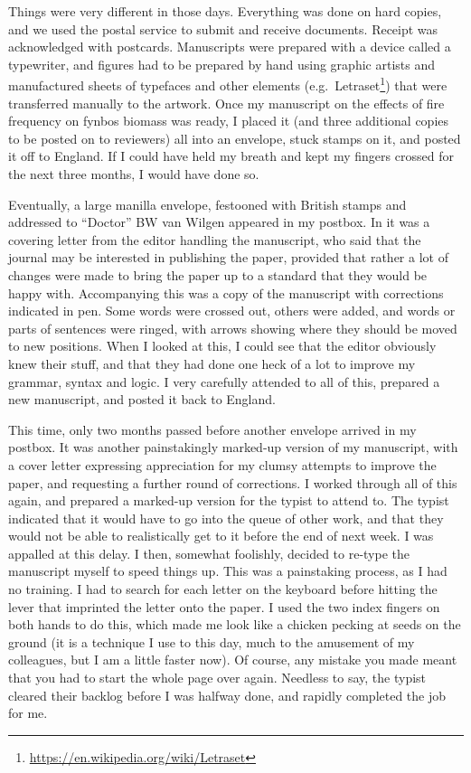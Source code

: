 \documentclass[
]{krantz}
\renewcommand{\href}[2]{#2\footnote{\url{#1}}}
\begin{document}
Things were very different in those days. Everything was done on hard copies, and we used the postal service to submit and receive documents. Receipt was acknowledged with postcards. Manuscripts were prepared with a device called a typewriter, and figures had to be prepared by hand using graphic artists and manufactured sheets of typefaces and other elements (e.g.~\href{https://en.wikipedia.org/wiki/Letraset}{Letraset}) that were transferred manually to the artwork. Once my manuscript on the effects of fire frequency on fynbos biomass was ready, I placed it (and three additional copies to be posted on to reviewers) all into an envelope, stuck stamps on it, and posted it off to England. If I could have held my breath and kept my fingers crossed for the next three months, I would have done so.

Eventually, a large manilla envelope, festooned with British stamps and addressed to ``Doctor'' BW van Wilgen appeared in my postbox. In it was a covering letter from the editor handling the manuscript, who said that the journal may be interested in publishing the paper, provided that rather a lot of changes were made to bring the paper up to a standard that they would be happy with. Accompanying this was a copy of the manuscript with corrections indicated in pen. Some words were crossed out, others were added, and words or parts of sentences were ringed, with arrows showing where they should be moved to new positions. When I looked at this, I could see that the editor obviously knew their stuff, and that they had done one heck of a lot to improve my grammar, syntax and logic. I very carefully attended to all of this, prepared a new manuscript, and posted it back to England.

This time, only two months passed before another envelope arrived in my postbox. It was another painstakingly marked-up version of my manuscript, with a cover letter expressing appreciation for my clumsy attempts to improve the paper, and requesting a further round of corrections. I worked through all of this again, and prepared a marked-up version for the typist to attend to. The typist indicated that it would have to go into the queue of other work, and that they would not be able to realistically get to it before the end of next week. I was appalled at this delay. I then, somewhat foolishly, decided to re-type the manuscript myself to speed things up. This was a painstaking process, as I had no training. I had to search for each letter on the keyboard before hitting the lever that imprinted the letter onto the paper. I used the two index fingers on both hands to do this, which made me look like a chicken pecking at seeds on the ground (it is a technique I use to this day, much to the amusement of my colleagues, but I am a little faster now). Of course, any mistake you made meant that you had to start the whole page over again. Needless to say, the typist cleared their backlog before I was halfway done, and rapidly completed the job for me.
\end{document}
